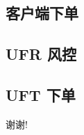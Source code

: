 \documentclass[12pt]{ctexbeamer}	%
\begin{document}
\begin{frame}{}
\end{frame}


\subsection{客户端下单}

\begin{frame}{}
\end{frame}


\subsection{UFR 风控}

\begin{frame}{}
\end{frame}


\subsection{UFT 下单}

\begin{frame}{}
\end{frame}


\begin{frame}
\centerline{\Large 谢谢!}
\end{frame}
\end{document}
